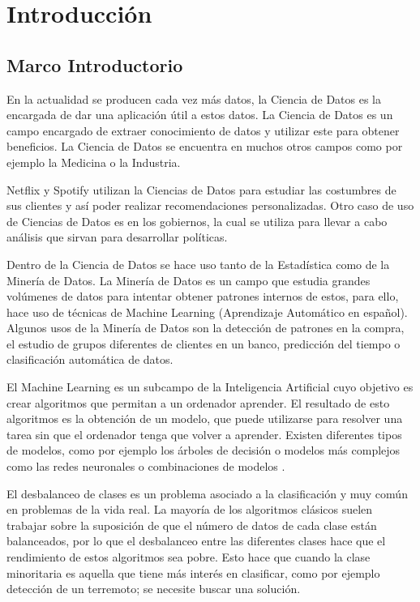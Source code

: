 \chapter{Introducción}
\section{Marco Introductorio}
En la actualidad se producen cada vez más datos, la Ciencia de Datos es la encargada de dar una aplicación útil a estos datos. La Ciencia de Datos es un campo encargado de extraer conocimiento de datos y utilizar este para obtener beneficios. La Ciencia de Datos se encuentra en muchos otros campos como por ejemplo la Medicina o la Industria.\newline

Netflix y Spotify utilizan la Ciencias de Datos para estudiar las costumbres de sus clientes y así poder realizar recomendaciones personalizadas. Otro caso de uso de Ciencias de Datos es en los gobiernos, la cual se utiliza para llevar a cabo análisis que sirvan para desarrollar políticas.\newline

Dentro de la Ciencia de Datos se hace uso tanto de la Estadística como de la Minería de Datos. La Minería de Datos es un campo que estudia grandes volúmenes de datos para intentar obtener patrones internos de estos, para ello, hace uso de técnicas de Machine Learning (Aprendizaje Automático en español). Algunos usos de la Minería de Datos son la detección de patrones en la compra, el estudio de grupos diferentes de clientes en un banco, predicción del tiempo o clasificación automática de datos.\newline

El Machine Learning es un subcampo de la Inteligencia Artificial cuyo objetivo es crear algoritmos que permitan a un ordenador aprender. El resultado de esto algoritmos es la obtención de un modelo, que puede utilizarse para resolver una tarea sin que el ordenador tenga que volver a aprender. Existen diferentes tipos de modelos, como por ejemplo los árboles de decisión o modelos más complejos como las redes neuronales o combinaciones de modelos \cite{boser1992training,breiman2001random,chen2016xgboost}.\newline

\newpage
El desbalanceo de clases es un problema asociado a la clasificación y muy común en problemas de la vida real. La mayoría de los algoritmos clásicos suelen trabajar sobre la suposición de que el número de datos de cada clase están balanceados, por lo que el desbalanceo entre las diferentes clases hace que el rendimiento de estos algoritmos sea pobre. Esto hace que cuando la clase minoritaria es aquella que tiene más interés en clasificar, como por ejemplo detección de un terremoto; se necesite buscar una solución.\newline


